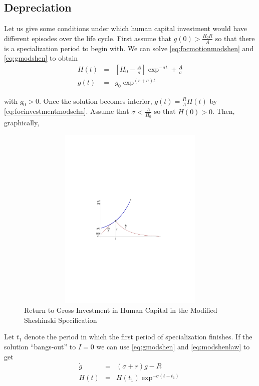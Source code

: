 \subsection{Depreciation} \label{section:cycles}
Let us give some conditions under which human capital investment would have different episodes over the life cycle. First assume that $g(0) > \frac{H_{0} R}{A}$ so that there is a specialization period to begin with. We can solve \eqref{eq:focmotionmodshen} and \eqref{eq:gmodshen} to obtain
\begin{eqnarray}
H(t) &=& \left[ H_{0} - \frac{A}{\sigma} \right] \exp^{- \sigma t} + \frac{A}{\sigma} \nonumber \\
g(t) &=& g_{0} \exp^{(r + \sigma)t} \label{eq:gmodshent1} \nonumber
\end{eqnarray}

\noindent with $g_{0} > 0$. Once the solution becomes interior, $g(t) = \frac{R}{A} H(t)$ by \eqref{eq:focinvestmentmodsehn}. Assume that  $\sigma < \frac{A}{H_{0}}$ so that $\dot{H(0)} > 0$. Then, graphically,

\begin{center}
\begin{figure}[H]
\caption{Return to Gross Investment in Human Capital in the Modified Sheshinski Specification}
\centering
\includegraphics[width=4.5in, height=3.5in]{Figures/fig-shesh-for-intersection.pdf}
\end{figure}
\end{center}

\indent Let $t_{1}$ denote the period in which the first period of specialization finishes. If the solution ``bangs-out'' to $I=0$ we can use \eqref{eq:gmodshen} and \eqref{eq:modshenlaw} to get
\begin{eqnarray}
\dot{g} &=& (\sigma + r)g - R \nonumber \\
H(t) &=& H(t_{1}) \exp^{-\sigma(t - t_{1})} 
\end{eqnarray}

